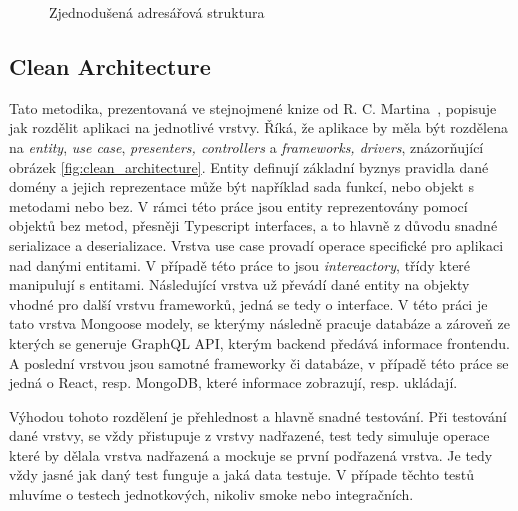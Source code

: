 \begin{figure}
    \caption{Zjednodušená adresářová struktura}
    \label{fig:modules}
\end{figure}

\subsection{Clean Architecture}
Tato metodika, prezentovaná ve stejnojmené knize od R. C. Martina~\cite{martin_2018_clean}, popisuje jak rozdělit aplikaci na jednotlivé vrstvy. Říká, že aplikace by měla být rozdělena na \emph{entity}, \emph{use case}, \emph{presenters, controllers} a \emph{frameworks, drivers}, znázorňující obrázek \ref{fig:clean_architecture}.
Entity definují základní byznys pravidla dané domény a jejich reprezentace může být například sada funkcí, nebo objekt s metodami nebo bez. V rámci této práce jsou entity reprezentovány pomocí objektů bez metod, přesněji Typescript interfaces, a to hlavně z důvodu snadné serializace a deserializace.
Vrstva use case provadí operace specifické pro aplikaci nad danými entitami. V případě této práce to jsou \emph{intereactory}, třídy které manipulují s entitami.
Následující vrstva už převádí dané entity na objekty vhodné pro další vrstvu frameworků, jedná se tedy o interface. V této práci je tato vrstva Mongoose modely, se kterýmy následně pracuje databáze a zároveň ze kterých se generuje GraphQL API, kterým backend předává informace frontendu. A poslední vrstvou jsou samotné frameworky či databáze, v případě této práce se jedná o React, resp. MongoDB, které informace zobrazují, resp. ukládají.

Výhodou tohoto rozdělení je přehlednost a hlavně snadné testování. Při testování dané vrstvy, se vždy přistupuje z vrstvy nadřazené, test tedy simuluje operace které by dělala vrstva nadřazená a mockuje se první podřazená vrstva. Je tedy vždy jasné jak daný test funguje a jaká data testuje. V případe těchto testů mluvíme o testech jednotkových, nikoliv smoke nebo integračních.

